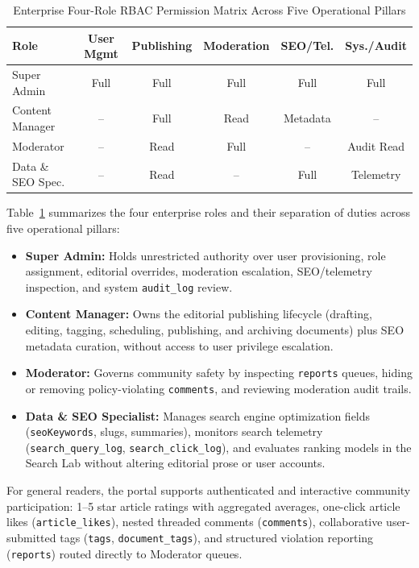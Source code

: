 \documentclass[conference]{IEEEtran}
\begin{document}
\begin{table}[htbp]
\caption{Enterprise Four-Role RBAC Permission Matrix Across Five Operational Pillars}
\begin{center}
\setlength{\tabcolsep}{3.5pt}
\renewcommand{\arraystretch}{1.15}
\begin{tabular}{@{}lccccc@{}}
\toprule
\textbf{Role} & \textbf{User Mgmt} & \textbf{Publishing} & \textbf{Moderation} & \textbf{SEO/Tel.} & \textbf{Sys./Audit} \\
\midrule
Super Admin & Full & Full & Full & Full & Full \\
Content Manager & -- & Full & Read & Metadata & -- \\
Moderator & -- & Read & Full & -- & Audit Read \\
Data \& SEO Spec. & -- & Read & -- & Full & Telemetry \\
\bottomrule
\end{tabular}
\label{tab:rbac}
\end{center}
\end{table}

Table~\ref{tab:rbac} summarizes the four enterprise roles and their separation of duties across five operational pillars:
\begin{itemize}
\item \textbf{Super Admin:} Holds unrestricted authority over user provisioning, role assignment, editorial overrides, moderation escalation, SEO/telemetry inspection, and system \texttt{audit\_log} review.
\item \textbf{Content Manager:} Owns the editorial publishing lifecycle (drafting, editing, tagging, scheduling, publishing, and archiving documents) plus SEO metadata curation, without access to user privilege escalation.
\item \textbf{Moderator:} Governs community safety by inspecting \texttt{reports} queues, hiding or removing policy-violating \texttt{comments}, and reviewing moderation audit trails.
\item \textbf{Data \& SEO Specialist:} Manages search engine optimization fields (\texttt{seoKeywords}, slugs, summaries), monitors search telemetry (\texttt{search\_query\_log}, \texttt{search\_click\_log}), and evaluates ranking models in the Search Lab without altering editorial prose or user accounts.
\end{itemize}

For general readers, the portal supports authenticated and interactive community participation: 1--5 star article ratings with aggregated averages, one-click article likes (\texttt{article\_likes}), nested threaded comments (\texttt{comments}), collaborative user-submitted tags (\texttt{tags}, \texttt{document\_tags}), and structured violation reporting (\texttt{reports}) routed directly to Moderator queues.
\end{document}

